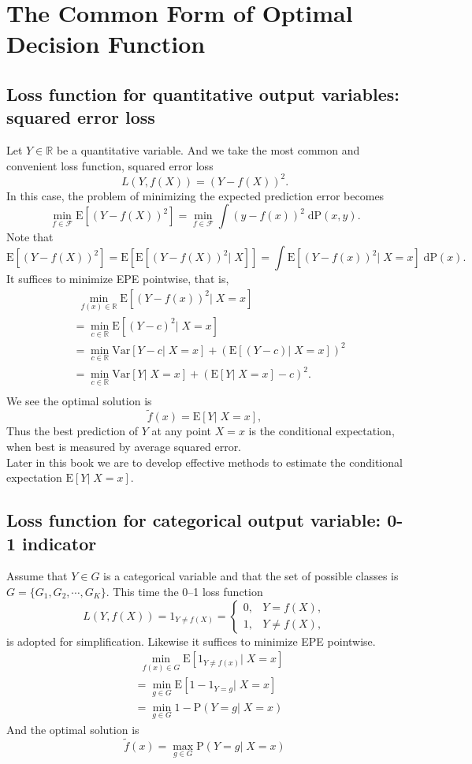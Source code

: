 \documentclass{report}
\theoremstyle{nonumberplain}
\newcommand{\0}{\mathbf{0}}
\begin{document}
		
	
\section{The Common Form of Optimal Decision Function }
\subsection{Loss function for quantitative output variables: squared error loss}
Let $Y\in\mathbb{R}$ be a quantitative variable. And we take the most
common and convenient loss function, squared error loss
\[
L(Y,f(X))=(Y-f(X))^2.
\]
In this case, the problem of minimizing the expected prediction error becomes
\[
\min_{f\in\mathcal{F}}\mathrm{E}[(Y-f(X))^2]=\min_{f\in\mathcal{F}}\int (y-f(x))^2\;\mathrm{dP}(x,y).
\]
Note that
\[\mathrm{E}[(Y-f(X))^2]=\mathrm{E}[\mathrm{E}[(Y-f(X))^2|\; X]]=\int\mathrm{E}[(Y-f(x))^2|\; X=x]\;\mathrm{dP}(x).\]
It suffices to minimize EPE pointwise, that is, 
\begin{align*}
&\ \ \min_{f(x)\in\mathbb{R}}\mathrm{E}[(Y-f(x))^2|\; X=x]\\
&=\min_{c\in\mathbb{R}}\mathrm{E}[(Y-c)^2|\; X=x]\\
&=\min_{c\in\mathbb{R}}\mathrm{Var}[Y-c|\; X=x]+(\mathrm{E}[(Y-c)|\; X=x])^2\\
&=\min_{c\in\mathbb{R}}\mathrm{Var}[Y|\; X=x]+(\mathrm{E}[Y|\; X=x]-c)^2.\\
\end{align*}
We see the optimal solution is
\[
\tilde{f}(x) = \mathrm{E}[Y|\; X=x],
\]
Thus the best prediction of $Y$ at any point $X = x$ is the conditional expectation, when best is measured by average squared error. \\
Later in this book we are to develop effective methods to estimate the conditional expectation $\mathrm{E}[Y|\; X=x]$.
\subsection{Loss function for categorical output variable: 0-1 indicator}
Assume that $Y\in G$ is a categorical variable and that the set of possible classes is $G=\{G_1,G_2,\cdots,G_K\}$. This time the 0–1 loss function 
\[
L(Y,f(X))=1_{Y\ne f(X)}=
\begin{cases}
0,&Y=f(X),\\
1,&Y\ne f(X),
\end{cases}
\]
is adopted for simplification. Likewise it suffices to minimize EPE pointwise.
\begin{align*}
&\ \ \min_{f(x)\in G}\mathrm{E}[1_{Y\ne f(x)}|\; X=x]\\
&=\min_{g\in G}\mathrm{E}[1-1_{Y=g}|\; X=x]\\
&=\min_{g\in G}1-\mathrm{P}(Y=g|\; X=x)
\end{align*}
And the optimal solution is
\[
\tilde{f}(x)=\max_{g\in G} \mathrm{P}(Y=g|\; X=x)
\]
\end{document}

